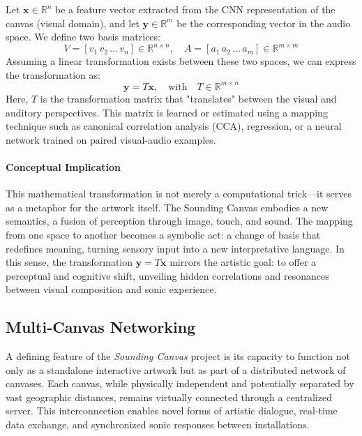 \documentclass{article}
\begin{document}
Let $\mathbf{x} \in \mathbb{R}^n$ be a feature vector extracted from the CNN representation of the canvas (visual domain), and let $\mathbf{y} \in \mathbb{R}^m$ be the corresponding vector in the audio space. \newline 
We define two basis matrices:
\[
V = [v_1 \, v_2 \, \ldots \, v_n] \in \mathbb{R}^{n \times n}, \quad A = [a_1 \, a_2 \, \ldots \, a_m] \in \mathbb{R}^{m \times m}
\]
Assuming a linear transformation exists between these two spaces, we can express the transformation as:
\[
\mathbf{y} = T \mathbf{x}, \quad \text{with} \quad T \in \mathbb{R}^{m \times n}
\]
\noindent
Here, $T$ is the transformation matrix that "translates" between the visual and auditory perspectives. This matrix is learned or estimated using a mapping technique such as canonical correlation analysis (CCA), regression, or a neural network trained on paired visual-audio examples.

\paragraph{Conceptual Implication}

This mathematical transformation is not merely a computational trick—it serves as a metaphor for the artwork itself. The Sounding Canvas embodies a new semantics, a fusion of perception through image, touch, and sound. The mapping from one space to another becomes a symbolic act: a change of basis that redefines meaning, turning sensory input into a new interpretative language. \newline
In this sense, the transformation $\mathbf{y} = T \mathbf{x}$ mirrors the artistic goal: to offer a perceptual and cognitive shift, unveiling hidden correlations and resonances between visual composition and sonic experience.

\subsection{Multi-Canvas Networking}
A defining feature of the \textit{Sounding Canvas} project is its capacity to function not only as a standalone interactive artwork but as part of a distributed network of canvases. Each canvas, while physically independent and potentially separated by vast geographic distances, remains virtually connected through a centralized server. This interconnection enables novel forms of artistic dialogue, real-time data exchange, and synchronized sonic responses between installations.
\end{document}
